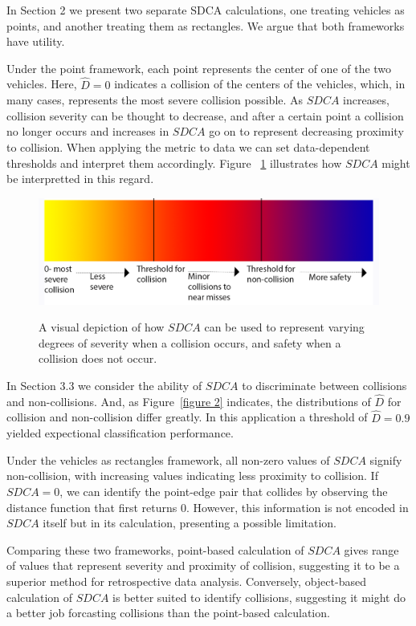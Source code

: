 \documentclass{article}
\begin{document}
In Section 2 we present two separate SDCA calculations, one treating vehicles as points, and another treating them as rectangles. We argue that both frameworks have utility.

Under the point framework, each point represents the center of one of the two vehicles. Here, $\hat{D} = 0$ indicates a collision of the centers of the vehicles, which, in many cases, represents the most severe collision possible. As $SDCA$ increases, collision severity can be thought to decrease, and after a certain point a collision no longer occurs and increases in $SDCA$ go on to represent decreasing proximity to collision.  When applying the metric to data we can set data-dependent thresholds and interpret them accordingly.  Figure~ \ref{figure 4} illustrates how $SDCA$ might be interpretted in this regard.

\begin{figure}[h!]
\begin{center}
\includegraphics[width = 12cm, height = 3 cm]{discussion_1.png}
\label{figure 4}
\caption{A visual depiction of how $SDCA$ can be used to represent varying degrees of severity when a collision occurs, and safety when a collision does not occur. }
\end{center}
\end{figure}

In Section 3.3 we consider the ability of $SDCA$ to discriminate between collisions and non-collisions. And, as Figure~\ref{figure 2} indicates, the distributions of $\hat{D}$ for collision and non-collision differ greatly.  In this application a threshold of $\hat{D} = 0.9$ yielded expectional classification performance.

Under the vehicles as rectangles framework, all non-zero values of $SDCA$ signify non-collision, with increasing values indicating less proximity to collision. If $SDCA = 0$, we can identify the point-edge pair that collides by observing the distance function that first returns 0. However, this information is not encoded in $SDCA$ itself but in its calculation, presenting a possible limitation.

Comparing these two frameworks, point-based calculation of $SDCA$ gives range of values that represent severity and proximity of collision, suggesting it to be a superior method for retrospective data analysis.  Conversely, object-based calculation of $SDCA$ is better suited to identify collisions, suggesting it might do a better job forcasting collisions than the point-based calculation.
\end{document}
